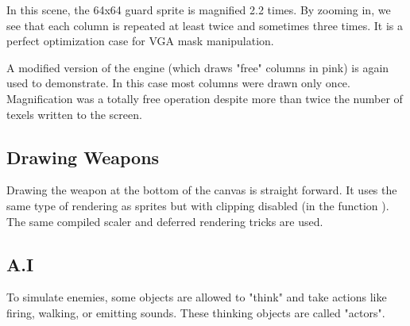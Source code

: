 \par
\begin{figure}[H]
 \centering
\end{figure}
In this scene, the 64x64 guard sprite is magnified 2.2 times. By zooming in, we see that each column is repeated at least twice and sometimes three times. It is a perfect optimization case for VGA mask manipulation.\\
\par
A modified version of the engine (which draws "free" columns in pink) is again used to demonstrate.  In this case most columns were drawn only once. Magnification was a totally free operation despite more than twice the number of texels written to the screen.\\

\par
\begin{figure}[H]
 \centering
\end{figure}
\begin{figure}[H]
 \centering
\end{figure}






\subsection{Drawing Weapons}
Drawing the weapon at the bottom of the canvas is straight forward. It uses the same type of rendering as sprites but with clipping disabled (in the function ). The same compiled scaler and deferred rendering tricks are used.














\subsection{A.I}
To simulate enemies, some objects are allowed to "think" and take actions like firing, walking, or emitting sounds. These thinking objects are called "actors".\\
\par






